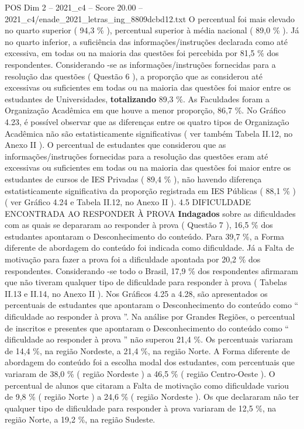 \begin{textsample}{POS Dim 2 – 2021\_c4 – Score 20.00 – 2021\_c4/enade\_2021\_letras\_ing\_8809dcbd12.txt}
O percentual foi mais elevado no quarto superior ( 94,3 \% ), percentual superior à média nacional ( 89,0 \% ).
Já no quarto inferior, a suficiência das informações/instruções declarada como até excessiva, em todas ou na maioria das questões foi percebida por 81,5 \% dos respondentes.
Considerando -se as informações/instruções fornecidas para a resolução das questões ( Questão 6 ), a proporção que as considerou até excessivas ou suficientes em todas ou na maioria das questões foi maior entre os estudantes de Universidades, \textbf{totalizando} 89,3 \%.
As Faculdades foram a Organização Acadêmica em que houve a menor proporção, 86,7 \%.
No Gráfico 4.23, é possível observar que as diferenças entre os quatro tipos de Organização Acadêmica não são estatisticamente significativas ( ver também Tabela II.12, no Anexo II ).
O percentual de estudantes que considerou que as informações/instruções fornecidas para a resolução das questões eram até excessivas ou suficientes em todas ou na maioria das questões foi maior entre os estudantes de cursos de IES Privadas ( 89,4 \% ), não havendo diferença estatisticamente significativa da proporção registrada em IES Públicas ( 88,1 \% ) ( ver Gráfico 4.24 e Tabela II.12, no Anexo II ). 4.5 DIFICULDADE ENCONTRADA AO RESPONDER À PROVA \textbf{Indagados} sobre as dificuldades com as quais se depararam ao responder à prova ( Questão 7 ), 16,5 \% dos estudantes apontaram o Desconhecimento do conteúdo.
Para 39,7 \%, a Forma diferente de abordagem do conteúdo foi indicada como dificuldade.
Já a Falta de motivação para fazer a prova foi a dificuldade apontada por 20,2 \% dos respondentes.
Considerando -se todo o Brasil, 17,9 \% dos respondentes afirmaram que não tiveram qualquer tipo de dificuldade para responder à prova ( Tabelas II.13 e II.14, no Anexo II ).
Nos Gráficos 4.25 a 4.28, são apresentados os percentuais de estudantes que apontaram o Desconhecimento do conteúdo como “ dificuldade ao responder à prova ”.
Na análise por Grandes Regiões, o percentual de inscritos e presentes que apontaram o Desconhecimento do conteúdo como “ dificuldade ao responder à prova ” não superou 21,4 \%.
Os percentuais variaram de 14,4 \%, na região Nordeste, a 21,4 \%, na região Norte.
A Forma diferente de abordagem do conteúdo foi a escolha modal dos estudantes, com percentuais que variaram de 38,0 \% ( região Nordeste ) a 46,5 \% ( região Centro-Oeste ).
O percentual de alunos que citaram a Falta de motivação como dificuldade variou de 9,8 \% ( região Norte ) a 24,6 \% ( região Nordeste ).
Os que declararam não ter qualquer tipo de dificuldade para responder à prova variaram de 12,5 \%, na região Norte, a 19,2 \%, na região Sudeste.

\end{textsample}
